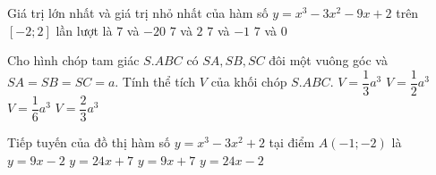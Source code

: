 \begin{ex}%
	Giá trị lớn nhất và giá trị nhỏ nhất của hàm số $y=x^3-3x^2-9x+2$ trên $[-2;2]$ lần lượt là
	\choice
	{\True $7$ và $-20$}
	{$7$ và $2$}
	{$7$ và $-1$}
	{$7$ và $0$}
	\end{ex}
\begin{ex}%
	Cho hình chóp tam giác $S.ABC$ có $SA, SB, SC$ đôi một vuông góc và $SA=SB=SC=a$. Tính thể tích $V$ của khối chóp $S.ABC$.
	\choice
	{$V=\dfrac{1}{3}a^3$}
	{$V=\dfrac{1}{2}a^3$}
	{\True $V=\dfrac{1}{6}a^3$}
	{$V=\dfrac{2}{3}a^3$}
	\end{ex}
\begin{ex}%
	Tiếp tuyến của đồ thị hàm số $y=x^3-3x^2+2$ tại điểm $A(-1;-2)$ là
	\choice
	{$y=9x-2$}
		{$y=24x+7$}
			{\True $y=9x+7$}
				{$y=24x-2$}
	\end{ex}
